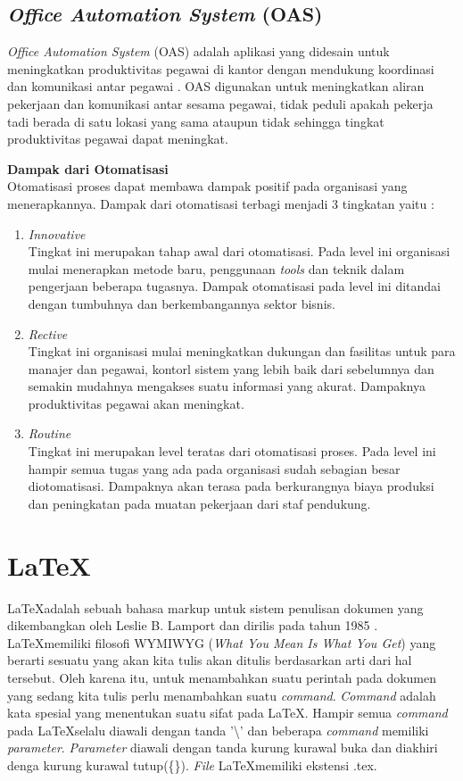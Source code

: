 \subsection{\textit{Office Automation System} (OAS)}
\label{sec:oas}
\textit{Office Automation System} (OAS) adalah aplikasi yang didesain untuk meningkatkan produktivitas pegawai di kantor dengan mendukung koordinasi dan komunikasi antar pegawai \cite{Laudon:1996}. OAS digunakan untuk meningkatkan aliran pekerjaan dan komunikasi antar sesama pegawai, tidak peduli apakah pekerja tadi berada di satu lokasi yang sama ataupun tidak sehingga tingkat produktivitas pegawai dapat meningkat.

\textbf{Dampak dari Otomatisasi}\\
Otomatisasi proses dapat membawa dampak positif pada organisasi yang menerapkannya. Dampak dari otomatisasi terbagi menjadi 3 tingkatan yaitu \cite{Susan:1982}: 
\begin{enumerate}
	\item \textit{Innovative}\\
	Tingkat ini merupakan tahap awal dari otomatisasi. Pada level ini organisasi mulai menerapkan metode baru, penggunaan \textit{tools} dan teknik dalam pengerjaan beberapa tugasnya. Dampak otomatisasi pada level ini ditandai dengan tumbuhnya dan berkembangannya sektor bisnis.
	\item \textit{Rective}\\
	Tingkat ini organisasi mulai meningkatkan dukungan dan fasilitas untuk para manajer dan pegawai, kontorl sistem yang lebih baik dari sebelumnya dan semakin mudahnya mengakses suatu informasi yang akurat. Dampaknya produktivitas pegawai akan meningkat.
	\item \textit{Routine}\\
	Tingkat ini merupakan level teratas dari otomatisasi proses. Pada level ini hampir semua tugas yang ada pada organisasi sudah sebagian besar diotomatisasi. Dampaknya akan terasa pada berkurangnya biaya produksi dan peningkatan pada muatan pekerjaan dari staf pendukung.
\end{enumerate}
 
\section{\LaTeX}
\label{sec:latex}
\LaTeX adalah sebuah bahasa markup untuk sistem penulisan dokumen yang dikembangkan oleh Leslie B. Lamport dan dirilis pada tahun 1985 \cite{Lamport:1994}. \LaTeX memiliki filosofi WYMIWYG (\textit{What You Mean Is What You Get}) yang berarti sesuatu yang akan kita tulis akan ditulis berdasarkan arti dari hal tersebut. Oleh karena itu, untuk menambahkan suatu perintah pada dokumen yang sedang kita tulis perlu menambahkan suatu \textit{command}. \textit{Command} adalah kata spesial yang menentukan suatu sifat pada \LaTeX. Hampir semua \textit{command} pada \LaTeX selalu diawali dengan tanda '\textbackslash' dan beberapa \textit{command} memiliki \textit{parameter}. \textit{Parameter} diawali dengan tanda kurung kurawal buka dan diakhiri denga kurung kurawal tutup(\{\}). \textit{File} \LaTeX memiliki ekstensi .tex.  

